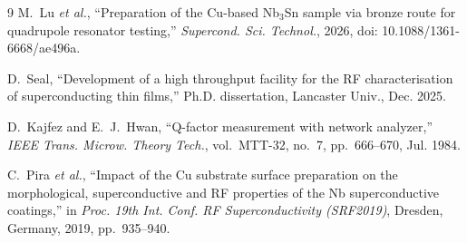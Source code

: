 \documentclass[10pt,journal]{IEEEtran}
\begin{document}
\begin{thebibliography}{9}
M.~Lu \emph{et al.}, ``Preparation of the Cu-based Nb$_3$Sn sample via bronze route for quadrupole resonator testing,'' \emph{Supercond. Sci. Technol.}, 2026, doi: 10.1088/1361-6668/ae496a.

D.~Seal, ``Development of a high throughput facility for the RF characterisation of superconducting thin films,'' Ph.D. dissertation, Lancaster Univ., Dec. 2025.

D.~Kajfez and E.~J.~Hwan, ``Q-factor measurement with network analyzer,'' \emph{IEEE Trans. Microw. Theory Tech.}, vol.~MTT-32, no.~7, pp.~666--670, Jul. 1984.

C.~Pira \emph{et al.}, ``Impact of the Cu substrate surface preparation on the morphological, superconductive and RF properties of the Nb superconductive coatings,'' in \emph{Proc. 19th Int. Conf. RF Superconductivity (SRF2019)}, Dresden, Germany, 2019, pp.~935--940.

\end{thebibliography}
\end{document}
